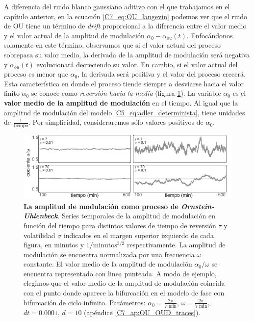 \documentclass[./main.tex]{subfiles}
\begin{document}
A diferencia del ruido blanco gaussiano aditivo con el que trabajamos en el capítulo anterior, en la ecuación \ref{C7_eq:OU_langevin} podemos ver que el ruido de OU tiene un término de \emph{drift} proporcional a la diferencia entre el valor medio y el valor actual de la amplitud de modulación $\alpha_0 - \alpha_{ou}(t)$. Enfocándonos solamente en este término, observamos que si el valor actual del proceso sobrepasa su valor medio, la derivada de la amplitud de modulación será negativa y $\alpha_{ou}(t)$ evolucionará decreciendo su valor. En cambio, si el valor actual del proceso es menor que $\alpha_0$, la derivada será positiva y el valor del proceso crecerá. Esta característica en donde el proceso tiende siempre a desviarse hacia el valor finito $\alpha_0$ se conoce como \emph{reversión hacia la media} (figura \ref{C7_fig:OU_alpha}).  La variable $\alpha_0$ es el \textbf{valor medio de la amplitud de modulación} en el tiempo. Al igual que la amplitud de modulación del modelo \ref{C5_eq:adler_determinista}, tiene unidades de $\frac{1}{\text{tiempo}}$. Por simplicidad, consideraremos sólo valores positivos de $\alpha_0$.

\begin{figure}
    \centering
    \includegraphics[width=1\columnwidth]{figures/chapter7/C7_OU_alpha.pdf} 
    \caption{\textbf{La amplitud de modulación como proceso de \textit{Ornstein-Uhlenbeck}}. Series temporales de la amplitud de modulación en función del tiempo para distintos valores de tiempo de reversión $\tau$ y volatilidad $\sigma$ indicados en el margen superior izquierdo de cada figura, en minutos y $1/\text{minutos}^{3/2}$ respectivamente. La amplitud de modulación se encuentra normalizada por una frecuencia $\omega$ constante. El valor medio de la amplitud de modulación $\alpha_0/\omega$ se encuentra representado con linea punteada. A modo de ejemplo, elegimos que el valor medio de la amplitud de modulación coincida con el punto donde aparece la bifurcación en el modelo de fase con bifurcación de ciclo infinito. Parámetros: $\alpha_0 = \frac{2\pi}{7 \text{ min}}$, $\omega = \frac{2\pi}{7 \text{ min}}$, $dt = 0.0001$, $d=10$ (apéndice \ref{C7_ap:OU_OUD_traces}).}
    \label{C7_fig:OU_alpha}
\end{figure} 
\end{document}
